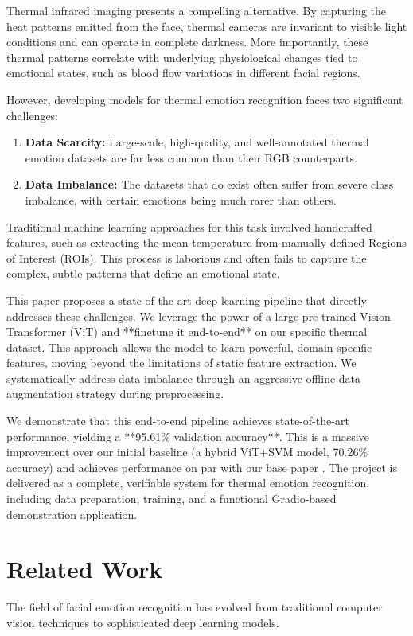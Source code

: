 \documentclass[12pt,a4paper]{report}
\begin{document}
Thermal infrared imaging presents a compelling alternative. By capturing the heat patterns emitted from the face, thermal cameras are invariant to visible light conditions and can operate in complete darkness. More importantly, these thermal patterns correlate with underlying physiological changes tied to emotional states, such as blood flow variations in different facial regions.

However, developing models for thermal emotion recognition faces two significant challenges:
\begin{enumerate}
    \item \textbf{Data Scarcity:} Large-scale, high-quality, and well-annotated thermal emotion datasets are far less common than their RGB counterparts.
    \item \textbf{Data Imbalance:} The datasets that do exist often suffer from severe class imbalance, with certain emotions being much rarer than others.
\end{enumerate}

Traditional machine learning approaches for this task involved handcrafted features, such as extracting the mean temperature from manually defined Regions of Interest (ROIs). This process is laborious and often fails to capture the complex, subtle patterns that define an emotional state.

This paper proposes a state-of-the-art deep learning pipeline that directly addresses these challenges. We leverage the power of a large pre-trained Vision Transformer (ViT) \cite{vit} and **finetune it end-to-end** on our specific thermal dataset. This approach allows the model to learn powerful, domain-specific features, moving beyond the limitations of static feature extraction. We systematically address data imbalance through an aggressive offline data augmentation strategy during preprocessing.

We demonstrate that this end-to-end pipeline achieves state-of-the-art performance, yielding a **95.61\% validation accuracy**. This is a massive improvement over our initial baseline (a hybrid ViT+SVM model, 70.26\% accuracy) and achieves performance on par with our base paper \cite{base_paper}. The project is delivered as a complete, verifiable system for thermal emotion recognition, including data preparation, training, and a functional Gradio-based demonstration application.

\chapter{Related Work}
\label{sec:related}
The field of facial emotion recognition has evolved from traditional computer vision techniques to sophisticated deep learning models.
\end{document}
